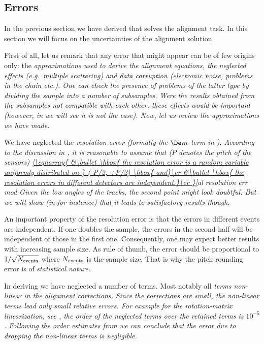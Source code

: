 \subsection[al err]{Errors}

In the previous section we have derived  that solves the alignment task. In this section we will focus on the uncertainties of the alignment solution.

First of all, let us remark that any error that might appear can be of few origins only: the \em{approximations} used to derive the alignment equations, the \em{neglected effects} (e.g.~multiple scattering) and \em{data corruption} (electronic noise, problems in the  chain etc.). One can check the presence of problems of the latter type by dividing the sample into a number of subsamples. Were the results obtained from the subsamples not compatible with each other, these effects would be important (however, in  we will see it is not the case). Now, let us review the approximations we have made.

\> We have neglected the \em{resolution error} (formally the $\De m$ term in ). According to the discussion in , it is reasonable to assume that ($P$ denotes the pitch of the sensors)
\eqref{\eqnarray{
	&\bullet \hbox{ the resolution error is a random variable uniformly distributed on } (-P/2, +P/2) \hbox{ and}\cr
	&\bullet \hbox{ the resolution errors in different detectors are independent.}\cr
}}{al resolution err mod}
Given the low angles of the  tracks, the second point might look doubtful. But we will show (in  for instance) that it leads to satisfactory results though.

\par\parindent\itindent\indent\hang
An important property of the resolution error is that the errors in different events are independent. If one doubles the sample, the errors in the second half will be independent of those in the first one. Consequently, one may expect better results with increasing sample size. As rule of thumb, the error should be proportional to $1/\sqrt{N_{\rm events}}$ where $N_{\rm events}$ is the sample size. That is why the pitch rounding error is of \em{statistical nature}.

\> In deriving  we have neglected a number of terms. Most notably all \em{terms non-linear in the alignment corrections}. Since the corrections are small, the non-linear terms lead only small relative errors. For example for the rotation-matrix linearization, see , the order of the neglected terms over the retained terms is $10^{-5}$. Following the order estimates from  we can conclude that the error due to dropping the non-linear terms is negligible.

